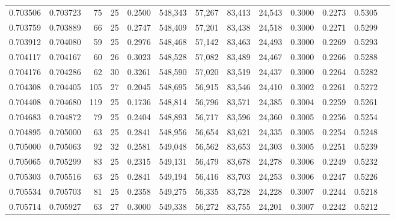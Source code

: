\begin{tabular}{rrrrrrrrrrrrr}
0.703506 & 0.703723 &     75 &    25 &                                     0.2500 & 548,343 &  57,267 &  83,413 &  24,543 & 0.3000 & 0.2273 & 0.5305 \\
0.703759 & 0.703889 &     66 &    25 &                                     0.2747 & 548,409 &  57,201 &  83,438 &  24,518 & 0.3000 & 0.2271 & 0.5299 \\
0.703912 & 0.704080 &     59 &    25 &                                     0.2976 & 548,468 &  57,142 &  83,463 &  24,493 & 0.3000 & 0.2269 & 0.5293 \\
0.704117 & 0.704167 &     60 &    26 &                                     0.3023 & 548,528 &  57,082 &  83,489 &  24,467 & 0.3000 & 0.2266 & 0.5288 \\
0.704176 & 0.704286 &     62 &    30 &                                     0.3261 & 548,590 &  57,020 &  83,519 &  24,437 & 0.3000 & 0.2264 & 0.5282 \\
0.704308 & 0.704405 &    105 &    27 &                                     0.2045 & 548,695 &  56,915 &  83,546 &  24,410 & 0.3002 & 0.2261 & 0.5272 \\
0.704408 & 0.704680 &    119 &    25 &                                     0.1736 & 548,814 &  56,796 &  83,571 &  24,385 & 0.3004 & 0.2259 & 0.5261 \\
0.704683 & 0.704872 &     79 &    25 &                                     0.2404 & 548,893 &  56,717 &  83,596 &  24,360 & 0.3005 & 0.2256 & 0.5254 \\
0.704895 & 0.705000 &     63 &    25 &                                     0.2841 & 548,956 &  56,654 &  83,621 &  24,335 & 0.3005 & 0.2254 & 0.5248 \\
0.705000 & 0.705063 &     92 &    32 &                                     0.2581 & 549,048 &  56,562 &  83,653 &  24,303 & 0.3005 & 0.2251 & 0.5239 \\
0.705065 & 0.705299 &     83 &    25 &                                     0.2315 & 549,131 &  56,479 &  83,678 &  24,278 & 0.3006 & 0.2249 & 0.5232 \\
0.705303 & 0.705516 &     63 &    25 &                                     0.2841 & 549,194 &  56,416 &  83,703 &  24,253 & 0.3006 & 0.2247 & 0.5226 \\
0.705534 & 0.705703 &     81 &    25 &                                     0.2358 & 549,275 &  56,335 &  83,728 &  24,228 & 0.3007 & 0.2244 & 0.5218 \\
0.705714 & 0.705927 &     63 &    27 &                                     0.3000 & 549,338 &  56,272 &  83,755 &  24,201 & 0.3007 & 0.2242 & 0.5212 \\

\end{tabular}
